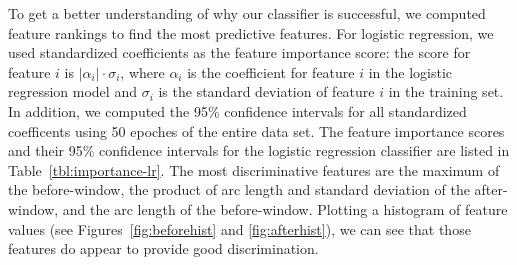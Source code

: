 



To get a better understanding of why our classifier is successful,
we computed feature rankings to find the most predictive features.
For logistic regression, we used standardized coefficients as the feature importance score:
the score for feature $i$ is $|\alpha_i| \cdot \sigma_i$, where $\alpha_i$ is the coefficient for feature $i$ in the logistic regression model and $\sigma_i$ is the standard deviation of feature $i$ in the training set.
In addition, we computed the 95\% confidence intervals for all standardized coefficents using 50 epoches of the entire data set.
The feature importance scores and their 95\% confidence intervals for the logistic regression classifier are listed in Table~\ref{tbl:importance-lr}.
The most discriminative features are
the maximum of the before-window,
the product of arc length and standard deviation of the after-window,
and the arc length of the before-window.
Plotting a histogram of feature values (see Figures~\ref{fig:beforehist} and \ref{fig:afterhist}), we can see that those features do appear to provide good discrimination.


